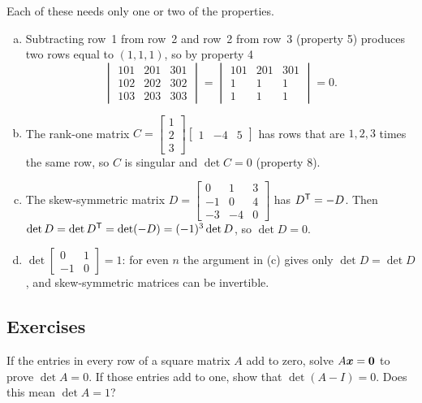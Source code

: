 \begin{example}\label{ex:u20-recitation}
Each of these needs only one or two of the properties.
\begin{enumerate}[(a)]
  \item Subtracting row~1 from row~2 and row~2 from row~3 (property 5) produces two rows
    equal to $(1,1,1)$, so by property 4
    \[
      \begin{vmatrix}101&201&301\\102&202&302\\103&203&303\end{vmatrix}
      =\begin{vmatrix}101&201&301\\1&1&1\\1&1&1\end{vmatrix}=0 .
    \]
  \item The rank-one matrix
    $C=\begin{bmatrix}1\\2\\3\end{bmatrix}\begin{bmatrix}1&-4&5\end{bmatrix}$ has rows that
    are $1,2,3$ times the same row, so $C$ is singular and $\det C=0$ (property 8).
  \item The skew-symmetric matrix
    $D=\left[\begin{smallmatrix}0&1&3\\-1&0&4\\-3&-4&0\end{smallmatrix}\right]$ has
    $D^{\mathsf{T}}=-D$. Then $\det D=\det D^{\mathsf{T}}=\det(-D)=(-1)^3\det D$, so $\det D=0$.
  \item $\det\left[\begin{smallmatrix}0&1\\-1&0\end{smallmatrix}\right]=1$: for even $n$ the
    argument in (c) gives only $\det D=\det D$, and skew-symmetric matrices can be invertible.
\end{enumerate}
\end{example}

\subsection{Exercises}

\begin{exercise}\label{ex:u20-rowsums}
If the entries in every row of a square matrix $A$ add to zero, solve $A\boldsymbol{x}=\boldsymbol{0}$ to
prove $\det A=0$. If those entries add to one, show that $\det(A-I)=0$. Does this mean
$\det A=1$?
\end{exercise}

